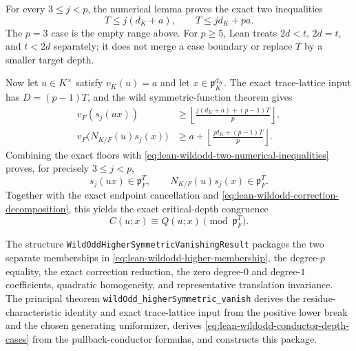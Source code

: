 \begin{lemma}
For every $3\le j<p$, the numerical lemma proves the exact two inequalities
\begin{equation}\label{eq:lean-wildodd-two-numerical-inequalities}
 T\le j(d_K+a),\qquad T\le jd_K+pa.
\end{equation}
The $p=3$ case is the empty range above.  For $p\ge5$, Lean treats
$2d<t$, $2d=t$, and $t<2d$ separately; it does not merge a case boundary
or replace $T$ by a smaller target depth.

Now let $u\in K^\times$ satisfy $v_K(u)=a$ and let
$x\in\mathfrak p_K^{d_K}$.  The exact trace-lattice input has
$D=(p-1)T$, and the wild symmetric-function theorem gives
\begin{align*}
 v_F(s_j(ux))
 &\ge \left\lfloor
   \frac{j(d_K+a)+(p-1)T}{p}\right\rfloor,\\
 v_F\bigl(N_{K/F}(u)s_j(x)\bigr)
 &\ge a+\left\lfloor
   \frac{jd_K+(p-1)T}{p}\right\rfloor.
\end{align*}
Combining the exact floors with
\eqref{eq:lean-wildodd-two-numerical-inequalities} proves, for precisely
$3\le j<p$,
\begin{equation}\label{eq:lean-wildodd-higher-membership}
 s_j(ux)\in\mathfrak p_F^T,
 \qquad N_{K/F}(u)s_j(x)\in\mathfrak p_F^T.
\end{equation}
Together with the exact endpoint cancellation and
\eqref{eq:lean-wildodd-correction-decomposition}, this yields the exact
critical-depth congruence
\begin{equation}\label{eq:lean-wildodd-quadratic-reduction}
 C(u;x)\equiv Q(u;x)\pmod{\mathfrak p_F^T}.
\end{equation}

The structure \texttt{WildOddHigherSymmetricVanishingResult} packages the
two separate memberships in \eqref{eq:lean-wildodd-higher-membership}, the
degree-$p$ equality, the exact correction reduction, the zero degree-$0$
and degree-$1$ coefficients, quadratic homogeneity, and representative
translation invariance.  The principal theorem
\texttt{wildOdd\_higherSymmetric\_vanish} derives the residue-characteristic
identity and exact trace-lattice input from the positive lower break and
the chosen generating uniformizer, derives
\eqref{eq:lean-wildodd-conductor-depth-cases} from the pullback-conductor
formulas, and constructs this package.


\end{lemma}
